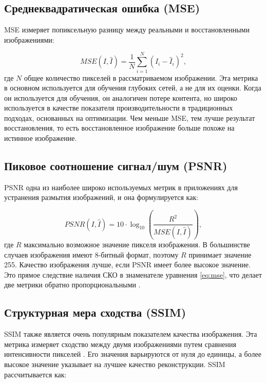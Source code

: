 \subsection{Среднеквадратическая ошибка (MSE)}

MSE измеряет попиксельную разницу между реальными и восстановленными изображениями:

\begin{equation}\label{eq:mse}
MSE(I, \hat{I}) = \frac{1}{N} \sum_{i=1}^{N} (I_{i} - \hat{I}_{i})^2,
\end{equation}
где \(N\) общее количество пикселей в рассматриваемом изображении. Эта метрика в основном используется для обучения глубоких сетей, а не для их оценки. Когда он используется для обучения, он аналогичен потере контента, но широко используется в качестве показателя производительности в традиционных подходах, основанных на оптимизации. Чем меньше MSE, тем лучше результат восстановления, то есть восстановленное изображение больше похоже на истинное изображение.

\subsection{Пиковое соотношение сигнал/шум (PSNR)}

PSNR одна из наиболее широко используемых метрик в приложениях для устранения размытия изображений, и она формулируется как:

\begin{equation}
	PSNR(I, \hat{I}) = 10 \cdot \log_{10} \left( \frac{R^{2}}{MSE(I, \hat{I})} \right),
\end{equation}
где \(R\) максимально возможное значение пикселя изображения. В большинстве случаев изображения имеют 8-битный формат, поэтому \(R\) принимает значение 255. Качество изображения лучше, если PSNR имеет более высокое значение. Это прямое следствие наличия СКО в знаменателе уравнения \ref{eq:mse}, что делает две метрики обратно пропорциональными \cite{hore2010image}.

\subsection{Структурная мера сходства (SSIM)}

SSIM также является очень популярным показателем качества изображения. Эта метрика измеряет сходство между двумя изображениями путем сравнения интенсивности пикселей \cite{wang2004image}. Его значения варьируются от нуля до единицы, а более высокое значение указывает на лучшее качество реконструкции. SSIM рассчитывается как:

